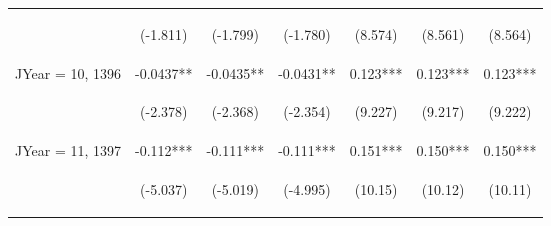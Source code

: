 \documentclass[]{standalone}
\begin{document}
\begin{tabular}{lcccccc}
    \vspace{4pt}     & \begin{footnotesize}(-1.811)\end{footnotesize} & \begin{footnotesize}(-1.799)\end{footnotesize} & \begin{footnotesize}(-1.780)\end{footnotesize} & \begin{footnotesize}(8.574)\end{footnotesize}  & \begin{footnotesize}(8.561)\end{footnotesize}  & \begin{footnotesize}(8.564)\end{footnotesize}  \\
    JYear = 10, 1396 & -0.0437**                                      & -0.0435**                                      & -0.0431**                                      & 0.123***                                       & 0.123***                                       & 0.123***                                       \\
    \vspace{4pt}     & \begin{footnotesize}(-2.378)\end{footnotesize} & \begin{footnotesize}(-2.368)\end{footnotesize} & \begin{footnotesize}(-2.354)\end{footnotesize} & \begin{footnotesize}(9.227)\end{footnotesize}  & \begin{footnotesize}(9.217)\end{footnotesize}  & \begin{footnotesize}(9.222)\end{footnotesize}  \\
    JYear = 11, 1397 & -0.112***                                      & -0.111***                                      & -0.111***                                      & 0.151***                                       & 0.150***                                       & 0.150***                                       \\
    \vspace{4pt}     & \begin{footnotesize}(-5.037)\end{footnotesize} & \begin{footnotesize}(-5.019)\end{footnotesize} & \begin{footnotesize}(-4.995)\end{footnotesize} & \begin{footnotesize}(10.15)\end{footnotesize}  & \begin{footnotesize}(10.12)\end{footnotesize}  & \begin{footnotesize}(10.11)\end{footnotesize}  \\

\end{tabular}
\end{document}
